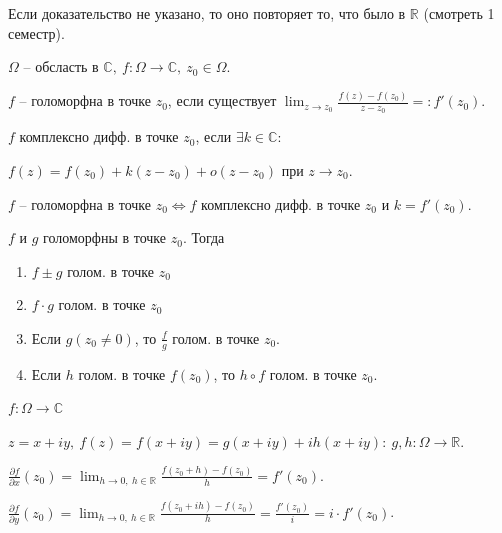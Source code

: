 
Если доказательство не указано, то оно повторяет то, что было в $\mathbb{R}$ (смотреть 1 семестр).

\begin{definition}
    $\Omega$ -- обсласть в $\mathbb{C}, \ f: \Omega \rightarrow \mathbb{C}, \ z_0 \in \Omega$.

    $f$ -- голоморфна в точке $z_0$, если существует $\lim_{z \rightarrow z_0} { \frac{f(z) - f(z_0)}{z - z_0} } =: f'(z_0)$.
\end{definition}
\begin{definition}
    $f$ комплексно дифф. в точке $z_0$, если $\exists k \in \mathbb{C}$:

    $f(z) = f(z_0) + k (z - z_0) + o(z - z_0)$ при $z \rightarrow z_0$.
\end{definition}

\begin{statement}
    $f$ -- голоморфна в точке $z_0 \Leftrightarrow f$ комплексно дифф. в точке $z_0$ и $k = f'(z_0)$.
\end{statement}

\begin{consequence}
    $f$ и $g$ голоморфны в точке $z_0$. Тогда 

    \begin{enumerate}
        \item {
            $f \pm g$ голом. в точке $z_0$
        }
        \item {
            $f \cdot g$ голом. в точке $z_0$
        }
        \item {
            Если $g(z_0 \not = 0)$, то $\frac{f}{g}$ голом. в точке $z_0$.
        }
        \item {
            Если $h$ голом. в точке $f(z_0)$, то $h \circ f$ голом. в точке $z_0$.
        }
    \end{enumerate}
\end{consequence}

\begin{remark}
    $f: \Omega \rightarrow \mathbb{C}$

    $z = x + iy, \ f(z) = f(x + iy) = g(x + i y) + i h(x + iy): \ g, h : \Omega \rightarrow \mathbb{R}$.

    $\frac{\partial f}{\partial x} (z_0) = \lim_{h \rightarrow 0, \ h \in \mathbb{R}} {\frac{f(z_0 + h) - f(z_0)}{h}} = f'(z_0)$.

    
    $\frac{\partial f}{\partial y} (z_0) = \lim_{h \rightarrow 0, \ h \in \mathbb{R}} {\frac{f(z_0 + i h) - f(z_0)}{h}} = \frac{f'(z_0)}{i} = i \cdot f'(z_0)$.
\end{remark}

